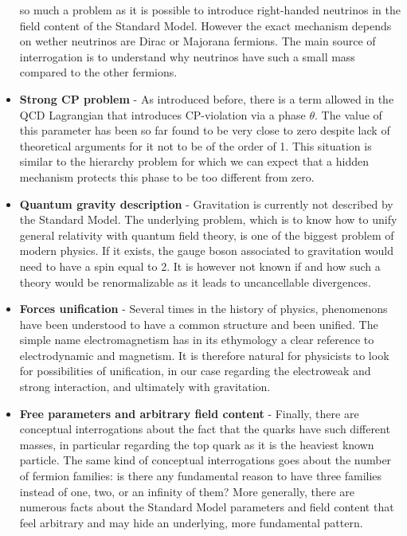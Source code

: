 \begin{itemize}
            so much a problem as it is possible to introduce right-handed neutrinos in the
            field content of the Standard Model. However the exact mechanism depends on
            wether neutrinos are Dirac or Majorana fermions. The main source of interrogation
            is to understand why neutrinos have such a small mass compared to the other
            fermions.
        \item \textbf{Strong CP problem} - As introduced before, there is a term allowed in
            the QCD Lagrangian that introduces CP-violation via a phase $\theta$. The value
            of this parameter has been so far found to be very close to zero despite
            lack of theoretical arguments for it not to be of the order of 1. This situation
            is similar to the hierarchy problem for which we can expect that a
            hidden mechanism protects this phase to be too different from zero.
        \item \textbf{Quantum gravity description} - Gravitation is currently not described
            by the Standard Model. The underlying problem, which is to know how to unify general
            relativity with quantum field theory, is one of the biggest problem of modern
            physics. If it exists, the gauge boson associated to gravitation would
            need to have a spin equal to 2. It is however not known if and how such
            a theory would be renormalizable as it leads to uncancellable divergences.
        \item \textbf{Forces unification} - Several times in the history of physics,
            phenomenons have been understood to have a common structure and
            been unified. The simple name electromagnetism has in its ethymology a clear
            reference to electrodynamic and magnetism. It is therefore natural for physicists
            to look for possibilities of unification, in our case regarding the electroweak
            and strong interaction, and ultimately with gravitation.
        \item \textbf{Free parameters and arbitrary field content} -
            Finally, there are conceptual interrogations about the fact that the quarks have
            such different masses, in particular regarding the top quark as it is the
            heaviest known particle. The same kind of conceptual interrogations goes about
            the number of fermion families: is there any fundamental reason to have three
            families instead of one, two, or an infinity of them? More generally, there
            are numerous facts about the Standard Model parameters and field content that
            feel arbitrary and may hide an underlying, more fundamental pattern.
    \end{itemize}


